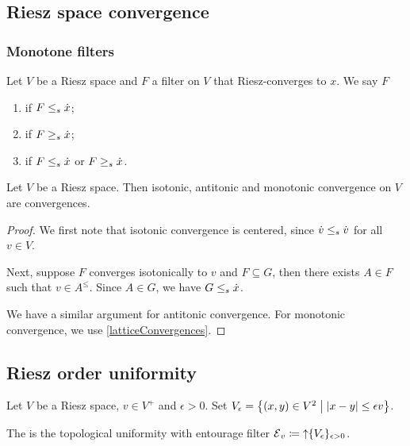 \subsection{Riesz space convergence}


\subsubsection{Monotone filters}
\begin{definition}
Let $V$ be a Riesz space and $F$ a filter on $V$ that Riesz-converges to $x$. We say $F$
\begin{enumerate}
\item {} if $F \leq_s\dot{x}$;
\item {} if $F \geq_s\dot{x}$;
\item {} if $F \leq_s\dot{x}$ or $F \geq_s\dot{x}$.
\end{enumerate}
\end{definition}

\begin{lemma}
Let $V$ be a Riesz space. Then isotonic, antitonic and monotonic convergence on $V$ are convergences.
\end{lemma}
\begin{proof}
We first note that isotonic convergence is centered, since $\dot{v} \leq_s \dot{v}$ for all $v\in V$.

Next, suppose $F$ converges isotonically to $v$ and $F\subseteq G$, then there exists $A\in F$ such that $v \in A^\leq$. Since $A\in G$, we have $G\leq_s \dot{x}$.

We have a similar argument for antitonic convergence. For monotonic convergence, we use \ref{latticeConvergences}.
\end{proof}

\subsection{Riesz order uniformity}
\begin{definition}
Let $V$ be a Riesz space, $v\in V^+$ and $\epsilon > 0$. Set $V_\epsilon = \setbuilder{(x,y)\in V^2}{|x-y| \leq \epsilon v}$.

The  is the topological uniformity with entourage filter $\operatorname{\mathcal{E}}_v \coloneqq \operatorname{\uparrow} \{V_\epsilon\}_{\epsilon > 0}$.
\end{definition}

